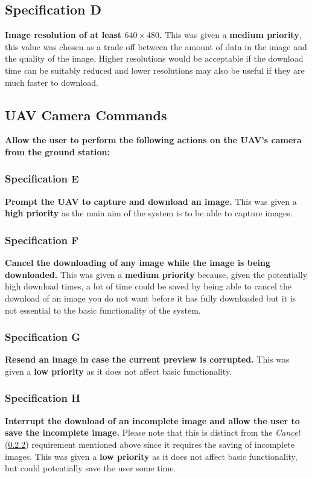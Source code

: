 	\subsection{Specification D}\label{sec:spec_d} \textbf{Image resolution of at least \textbf{$640\times480$}.} 
This was given a \textbf{medium priority}, this value was chosen as a trade off between the amount of data in the image and the quality of the image. Higher resolutions would be acceptable if the download time can be suitably reduced and lower resolutions may also be useful if they are much faster to download.
	\subsection{UAV Camera Commands} \textbf{Allow the user to perform the following actions on the UAV’s camera from the ground station:} 
		\subsubsection{Specification E}\label{sec:spec_e} \textbf{Prompt the UAV to \textbf{capture and download an image}.}  
This was given a \textbf{high priority} as the main aim of the system is to be able to capture images.
		\subsubsection{Specification F}\label{sec:spec_f} \textbf{\textbf{Cancel} the downloading of any image while the image is being downloaded.} 
This was given a \textbf{medium priority} because, given the potentially high download times, a lot of time could be saved by being able to cancel the download of an image you do not want before it has fully downloaded but it is not essential to the basic functionality of the system.
		\subsubsection{Specification G}\label{sec:spec_g} \textbf{\textbf{Resend} an image in case the current preview is corrupted.}  
This was given a \textbf{low priority} as it does not affect basic functionality.
		\subsubsection{Specification H}\label{sec:spec_h} \textbf{\textbf{Interrupt} the download of an incomplete image and allow the user to save the incomplete image.}  
Please note that this is distinct from the \emph{Cancel} (\ref{sec:spec_f}) requirement mentioned above since it requires the saving of incomplete images. This was given a \textbf{low priority} as it does not affect basic functionality, but could potentially save the user some time.
